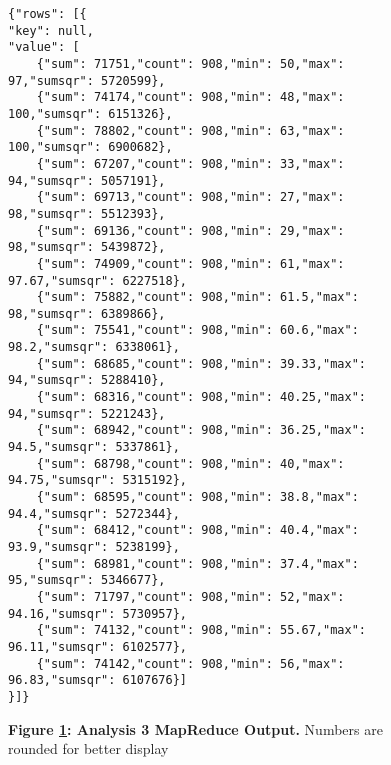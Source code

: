\begin{figure}[H]
    \centering
    \begin{mdframed}
        \centering
        \begin{verbatim}
{"rows": [{
"key": null,
"value": [
    {"sum": 71751,"count": 908,"min": 50,"max": 97,"sumsqr": 5720599},
    {"sum": 74174,"count": 908,"min": 48,"max": 100,"sumsqr": 6151326},
    {"sum": 78802,"count": 908,"min": 63,"max": 100,"sumsqr": 6900682},
    {"sum": 67207,"count": 908,"min": 33,"max": 94,"sumsqr": 5057191},
    {"sum": 69713,"count": 908,"min": 27,"max": 98,"sumsqr": 5512393},
    {"sum": 69136,"count": 908,"min": 29,"max": 98,"sumsqr": 5439872},
    {"sum": 74909,"count": 908,"min": 61,"max": 97.67,"sumsqr": 6227518},
    {"sum": 75882,"count": 908,"min": 61.5,"max": 98,"sumsqr": 6389866},
    {"sum": 75541,"count": 908,"min": 60.6,"max": 98.2,"sumsqr": 6338061},
    {"sum": 68685,"count": 908,"min": 39.33,"max": 94,"sumsqr": 5288410},
    {"sum": 68316,"count": 908,"min": 40.25,"max": 94,"sumsqr": 5221243},
    {"sum": 68942,"count": 908,"min": 36.25,"max": 94.5,"sumsqr": 5337861},
    {"sum": 68798,"count": 908,"min": 40,"max": 94.75,"sumsqr": 5315192},
    {"sum": 68595,"count": 908,"min": 38.8,"max": 94.4,"sumsqr": 5272344},
    {"sum": 68412,"count": 908,"min": 40.4,"max": 93.9,"sumsqr": 5238199},
    {"sum": 68981,"count": 908,"min": 37.4,"max": 95,"sumsqr": 5346677},
    {"sum": 71797,"count": 908,"min": 52,"max": 94.16,"sumsqr": 5730957},
    {"sum": 74132,"count": 908,"min": 55.67,"max": 96.11,"sumsqr": 6102577},
    {"sum": 74142,"count": 908,"min": 56,"max": 96.83,"sumsqr": 6107676}]
}]}      
        \end{verbatim}
    \end{mdframed}
    \caption[Analysis 3 MapReduce Output]{\textbf{Figure \ref{fig-variance-reduce-output}: Analysis 3 MapReduce Output.} Numbers are rounded for better display}
    \label{fig-variance-reduce-output}
\end{figure}
